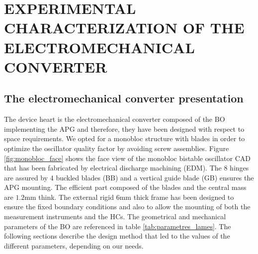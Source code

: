\documentclass[3p,twocolumn,preprint]{elsarticle}
\begin{document}
\section{EXPERIMENTAL CHARACTERIZATION OF THE \mbox{ELECTROMECHANICAL} CONVERTER}
\label{sec:EXPERIMENTAL CHARACTERIZATIONS OF THE ELECTROMECHANICAL CONVERTER}
	\subsection{The electromechanical converter presentation}	
	\label{The electromechanical converter presentation}
The device heart is the electromechanical converter composed of the BO implementing the APG and therefore, they have been designed with respect to space requirements. We opted for a monobloc structure with blades in order to optimize the oscillator quality factor by avoiding screw assemblies. Figure \ref{fig:monobloc_face} shows the face view of the monobloc bistable oscillator CAD that has been fabricated by electrical discharge machining (EDM). The 8 hinges are assured by 4 buckled blades (BB) and a vertical guide blade (GB) ensures the APG mounting. The efficient part composed of the blades and the central mass are $1.2$mm think. The external rigid 6mm thick frame has been designed to ensure the fixed boundary conditions and also to allow the mounting of both the measurement instruments and the HCs. The geometrical and mechanical parameters of the BO are referenced in table \ref{tab:parametres_lames}. The following sections describe the design method that led to the values of the different parameters, depending on our needs.
\end{document}

